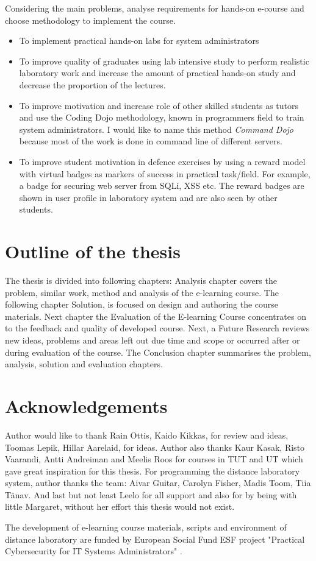 Considering the main problems, analyse requirements for hands-on e-course and choose methodology to implement the course.


\begin{itemize}
\item To implement practical hands-on labs for system administrators
\item To improve quality of graduates using lab intensive study  to perform realistic laboratory work and increase the amount of practical hands-on study and decrease the proportion of the lectures.
\item To improve motivation and increase role of other skilled students as tutors and use the \gls{Coding Dojo} methodology, known in programmers field to train system administrators. I would like to name this method  \emph{Command Dojo} because most of the work is done in command line of different servers.
\item To improve student motivation in defence exercises by using a reward model with virtual badges as markers of success in practical task/field. For example, a badge for securing web server from \gls{SQLi}, \gls{XSS} etc. The reward badges are shown in user profile in laboratory system and are also seen by other students.
\end{itemize}
\par


\section{Outline of the thesis}
The thesis is divided into following chapters: Analysis chapter covers the problem, similar work, method and analysis of the e-learning course. The following chapter Solution, is focused on design and authoring the course materials. Next chapter the Evaluation of the E-learning Course concentrates on to the feedback and quality of developed course. Next, a Future Research reviews new ideas, problems and areas left out due time and scope or occurred after or during evaluation of the course. The Conclusion chapter summarises the problem, analysis, solution and evaluation chapters.



\section{Acknowledgements}
Author would like to thank Rain Ottis, Kaido Kikkas, for review and ideas, Toomas Lepik, Hillar Aarelaid, for ideas. Author also thanks Kaur Kasak, Risto Vaarandi, Antti Andreiman and Meelis Roos for courses in TUT and UT which gave great inspiration for this thesis. For programming the distance laboratory system, author thanks the team: Aivar Guitar, Carolyn Fisher, Madis Toom, Tiia Tänav. And last but not least Leelo for all support and also for by being with little Margaret, without her effort this thesis would not exist.

The development of e-learning course materials, scripts and environment of distance laboratory are funded by European Social Fund \gls{ESF} project "Practical Cybersecurity for IT Systems Administrators" \citep{website:ESF_project}.

